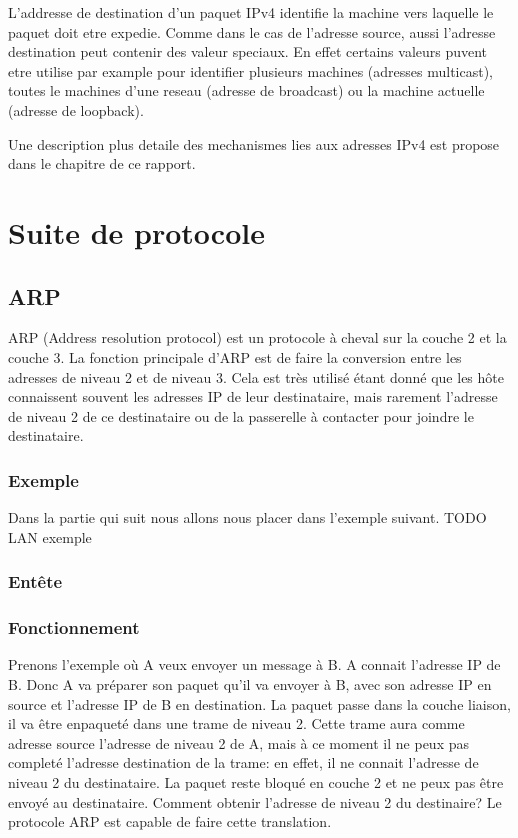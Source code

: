 \documentclass[twoside,openright,a4paper,11pt,french]{article}
\begin{document}
\begin{description}
L'addresse de destination d'un paquet IPv4 identifie la machine vers
laquelle le paquet doit etre expedie. Comme dans le cas de l'adresse source,
aussi l'adresse destination peut contenir des valeur speciaux. En effet certains 
valeurs puvent etre utilise par example pour identifier plusieurs machines
(adresses multicast), toutes le machines d'une reseau (adresse de broadcast) ou
la machine actuelle (adresse de loopback).


Une description plus detaile des mechanismes lies aux adresses IPv4 est
propose dans le chapitre 
de ce rapport.











\end{description}




\section{Suite de protocole}

\subsection{ARP}
ARP (Address resolution protocol) est un protocole à cheval sur la couche 2 et
la couche 3. La fonction principale d'ARP est de faire la conversion entre les
adresses de niveau 2 et de niveau 3. Cela est très utilisé étant donné que les
hôte connaissent souvent les adresses IP de leur destinataire, mais rarement
l'adresse de niveau 2 de ce destinataire ou de la passerelle à contacter pour joindre
le destinataire.

\subsubsection{Exemple}
Dans la partie qui suit nous allons nous placer dans l'exemple suivant.
TODO LAN exemple
\subsubsection{Entête}

\subsubsection{Fonctionnement}
Prenons l'exemple où A veux envoyer un message à B. A connait l'adresse IP de
B. Donc A va préparer son paquet qu'il va envoyer à B, avec son adresse IP en
source et l'adresse IP de B en destination. La paquet passe dans la couche
liaison, il va être enpaqueté dans une trame de niveau 2. Cette trame aura
comme adresse source l'adresse de niveau 2 de A, mais à ce moment il ne peux
pas completé l'adresse destination de la trame: en effet, il ne connait
l'adresse de niveau 2 du destinataire. La paquet reste bloqué en couche 2 et ne
peux pas être envoyé au destinataire. Comment obtenir l'adresse de niveau 2 du destinaire?
Le protocole ARP est capable de faire cette translation.
\end{document}

